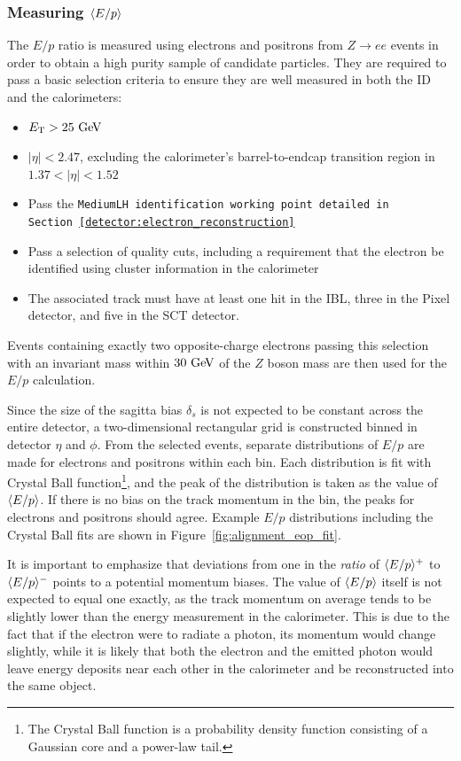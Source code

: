 \subsubsection{Measuring $\langle E/p\rangle$}
The $E/p$ ratio is measured using electrons and positrons from $Z\rightarrow ee$ events in order to obtain a high purity sample of candidate particles.
They are required to pass a basic selection criteria to ensure they are well measured in both the ID and the calorimeters:
\begin{itemize}
  \item $\et > 25\gev$
  \item $|\eta| < 2.47$, excluding the calorimeter's barrel-to-endcap transition region in $1.37<|\eta|<1.52$
  \item Pass the \tt{MediumLH} identification working point detailed in Section~\ref{detector:electron_reconstruction}
  \item Pass a selection of quality cuts, including a requirement that the electron be identified using cluster information in the calorimeter %
  \item The associated track must have at least one hit in the IBL, three in the Pixel detector, and five in the SCT detector.
\end{itemize}
Events containing exactly two opposite-charge electrons passing this selection with an invariant mass within $30\gev$ of the $Z$ boson mass are then used for the $E/p$ calculation.

Since the size of the sagitta bias $\delta_s$ is not expected to be constant across the entire detector, a two-dimensional rectangular grid is constructed binned in detector $\eta$ and $\phi$.
From the selected events, separate distributions of $E/p$ are made for electrons and positrons within each bin.
Each distribution is fit with Crystal Ball function\footnote{The Crystal Ball function is a probability density function consisting of a Gaussian core and a power-law tail.}, and the peak of the distribution is taken as the value of $\langle E/p\rangle$.
If there is no bias on the track momentum in the bin, the peaks for electrons and positrons should agree.
Example $E/p$ distributions including the Crystal Ball fits are shown in Figure~\ref{fig:alignment_eop_fit}.

It is important to emphasize that deviations from one in the \emph{ratio} of $\langle E/p\rangle^+$ to $\langle E/p\rangle^-$ points to a potential momentum biases.
The value of $\langle E/p\rangle$ itself is not expected to equal one exactly, as the track momentum on average tends to be slightly lower than the energy measurement in the calorimeter.
This is due to the fact that if the electron were to radiate a photon, its momentum would change slightly, while it is likely that both the electron and the emitted photon would leave energy deposits near each other in the calorimeter and be reconstructed into the same object. 

